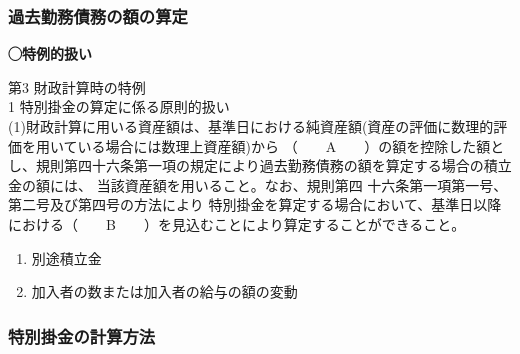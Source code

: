 \subsubsection{過去勤務債務の額の算定}

\begin{fillblank}[数理人試験 2021 問題1 設問1 A,B]
  \noindent \textbf{◯特例的扱い}
  \begin{lawstructure}
    \begin{lawarticle}{}{}
      \noindent 第3 財政計算時の特例
      \\

1 特別掛金の算定に係る原則的扱い
\\

(1)財政計算に用いる資産額は、基準日における純資産額(資産の評価に数理的評価を用いている場合には数理上資産額)から
（　　A　　）の額を控除した額とし、規則第四十六条第一項の規定により過去勤務債務の額を算定する場合の積立金の額には、
当該資産額を用いること。なお、規則第四 十六条第一項第一号、第二号及び第四号の方法により
特別掛金を算定する場合において、基準日以降における（　　B　　）を見込むことにより算定することができること。

    \end{lawarticle}
  \end{lawstructure}
\end{fillblank}

\begin{answerbox}
  \begin{enumerate}[A: ]
    \item 別途積立金
    \item 加入者の数または加入者の給与の額の変動
  \end{enumerate}
\end{answerbox}

\newpage

\subsubsection{特別掛金の計算方法}

